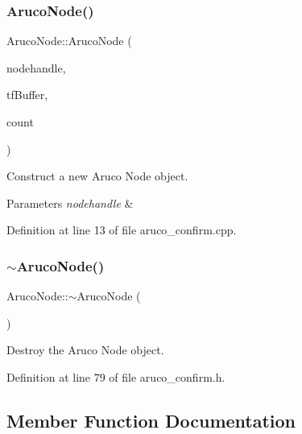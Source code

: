 \subsubsection{\texorpdfstring{Aruco\+Node()}{ArucoNode()}}
{\footnotesize\ttfamily Aruco\+Node\+::\+Aruco\+Node (\begin{DoxyParamCaption}\item[{ros\+::\+Node\+Handle $\ast$}]{nodehandle,  }\item[{tf2\+\_\+ros\+::\+Buffer \&}]{tf\+Buffer,  }\item[{int}]{count }\end{DoxyParamCaption})}



Construct a new Aruco Node object. 


\begin{DoxyParams}{Parameters}
{\em nodehandle} & \\
\hline
\end{DoxyParams}


Definition at line 13 of file aruco\+\_\+confirm.\+cpp.

\mbox{\label{class_aruco_node_a134694163a28530a800198e2c039eb25}} 
\subsubsection{\texorpdfstring{$\sim$\+Aruco\+Node()}{~ArucoNode()}}
{\footnotesize\ttfamily Aruco\+Node\+::$\sim$\+Aruco\+Node (\begin{DoxyParamCaption}{ }\end{DoxyParamCaption})\hspace{0.3cm}{\ttfamily [inline]}}



Destroy the Aruco Node object. 



Definition at line 79 of file aruco\+\_\+confirm.\+h.



\subsection{Member Function Documentation}
\mbox{\label{class_aruco_node_af68c583d73a36c483d28b96a6fd22713}} 
